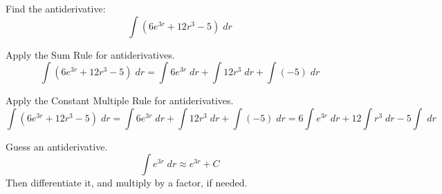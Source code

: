 \documentclass{ximera}
\author{Emma Smith Zbarsky\and Nela Lakos}
\begin{document}
\begin{exercise}

Find the antiderivative: \[\int \left(6e^{3r} +12r^3 -5\right)\; dr\]

\begin{hint}
Apply the Sum Rule for antiderivatives.
\[\int \left(6e^{3r} +12r^3 -5\right)\; dr=\int 6e^{3r}\; dr +\int12r^3\; dr+ \int(-5)\; dr\]
\end{hint}


\begin{hint}
Apply the Constant Multiple Rule for antiderivatives.
\[\int \left(6e^{3r} +12r^3 -5\right)\; dr=\int 6e^{3r}\; dr +\int12r^3\; dr+ \int(-5)\; dr=6\int e^{3r}\; dr +12\int r^3\; dr-5 \int\; dr\]
\end{hint}
\begin{hint}
Guess an antiderivative.
\[\int e^{3r}\; dr \approx e^{3r}+C \]
Then differentiate it, and multiply by a factor, if needed.
\end{hint}
\begin{multipleChoice}
\end{multipleChoice}

\end{exercise}
\end{document}
